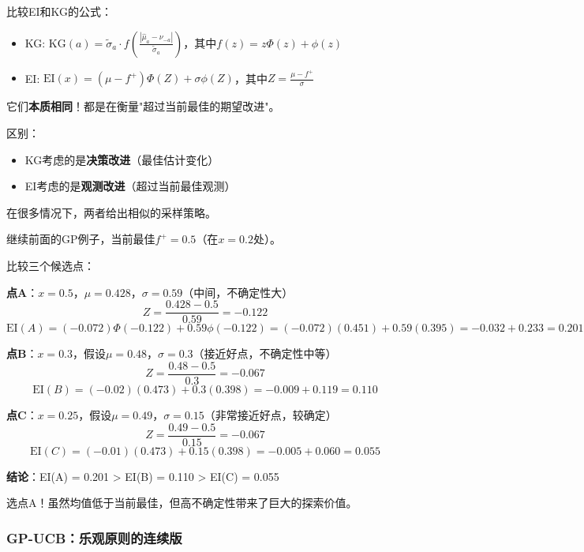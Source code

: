 \documentclass[11pt,a4paper]{article}
\theoremstyle{definition}
\begin{document}
\begin{keypoint}[EI vs KG的联系]
比较EI和KG的公式：
\begin{itemize}
    \item KG: $\text{KG}(a) = \tilde{\sigma}_a \cdot f\left(\frac{|\hat{\mu}_a - \nu_{-a}|}{\tilde{\sigma}_a}\right)$，其中$f(z) = z\Phi(z) + \phi(z)$
    \item EI: $\text{EI}(x) = (\mu - f^+)\Phi(Z) + \sigma\phi(Z)$，其中$Z = \frac{\mu - f^+}{\sigma}$
\end{itemize}

它们\textbf{本质相同}！都是在衡量"超过当前最佳的期望改进"。

区别：
\begin{itemize}
    \item KG考虑的是\textbf{决策改进}（最佳估计变化）
    \item EI考虑的是\textbf{观测改进}（超过当前最佳观测）
\end{itemize}

在很多情况下，两者给出相似的采样策略。
\end{keypoint}

\begin{calculation}[EI的完整计算]
继续前面的GP例子，当前最佳$f^+ = 0.5$（在$x=0.2$处）。

比较三个候选点：

\textbf{点A}：$x=0.5$，$\mu = 0.428$，$\sigma = 0.59$（中间，不确定性大）
\[
Z = \frac{0.428 - 0.5}{0.59} = -0.122
\]
\[
\text{EI}(A) = (-0.072)\Phi(-0.122) + 0.59\phi(-0.122) = (-0.072)(0.451) + 0.59(0.395) = -0.032 + 0.233 = 0.201
\]

\textbf{点B}：$x=0.3$，假设$\mu = 0.48$，$\sigma = 0.3$（接近好点，不确定性中等）
\[
Z = \frac{0.48 - 0.5}{0.3} = -0.067
\]
\[
\text{EI}(B) = (-0.02)(0.473) + 0.3(0.398) = -0.009 + 0.119 = 0.110
\]

\textbf{点C}：$x=0.25$，假设$\mu = 0.49$，$\sigma = 0.15$（非常接近好点，较确定）
\[
Z = \frac{0.49 - 0.5}{0.15} = -0.067
\]
\[
\text{EI}(C) = (-0.01)(0.473) + 0.15(0.398) = -0.005 + 0.060 = 0.055
\]

\textbf{结论}：EI(A) = 0.201 > EI(B) = 0.110 > EI(C) = 0.055

选点A！虽然均值低于当前最佳，但高不确定性带来了巨大的探索价值。
\end{calculation}

\subsubsection{GP-UCB：乐观原则的连续版}
\end{document}
